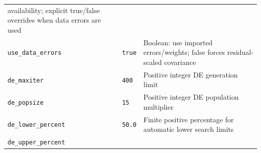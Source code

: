 \documentclass[
  10pt,
  a4paper,
  oneside]{scrreprt}
\begin{document}
\begin{longtable}[]{@{}lll@{}}
\begin{minipage}[t]{0.30\columnwidth}
availability; explicit true/false overrides when data errors are
used\strut
\end{minipage}\tabularnewline
\begin{minipage}[t]{0.30\columnwidth}\raggedright
\texttt{use\_data\_errors}\strut
\end{minipage} & \begin{minipage}[t]{0.30\columnwidth}\raggedright
\texttt{true}\strut
\end{minipage} & \begin{minipage}[t]{0.30\columnwidth}\raggedright
Boolean: use imported errors/weights; false forces residual-scaled
covariance\strut
\end{minipage}\tabularnewline
\begin{minipage}[t]{0.30\columnwidth}\raggedright
\texttt{de\_maxiter}\strut
\end{minipage} & \begin{minipage}[t]{0.30\columnwidth}\raggedright
\texttt{400}\strut
\end{minipage} & \begin{minipage}[t]{0.30\columnwidth}\raggedright
Positive integer DE generation limit\strut
\end{minipage}\tabularnewline
\begin{minipage}[t]{0.30\columnwidth}\raggedright
\texttt{de\_popsize}\strut
\end{minipage} & \begin{minipage}[t]{0.30\columnwidth}\raggedright
\texttt{15}\strut
\end{minipage} & \begin{minipage}[t]{0.30\columnwidth}\raggedright
Positive integer DE population multiplier\strut
\end{minipage}\tabularnewline
\begin{minipage}[t]{0.30\columnwidth}\raggedright
\texttt{de\_lower\_percent}\strut
\end{minipage} & \begin{minipage}[t]{0.30\columnwidth}\raggedright
\texttt{50.0}\strut
\end{minipage} & \begin{minipage}[t]{0.30\columnwidth}\raggedright
Finite positive percentage for automatic lower search limits\strut
\end{minipage}\tabularnewline
\begin{minipage}[t]{0.30\columnwidth}\raggedright
\texttt{de\_upper\_percent}\strut
\end{minipage} & \begin{minipage}[t]{0.30\columnwidth}\raggedright

\end{minipage}
\end{longtable}
\end{document}
